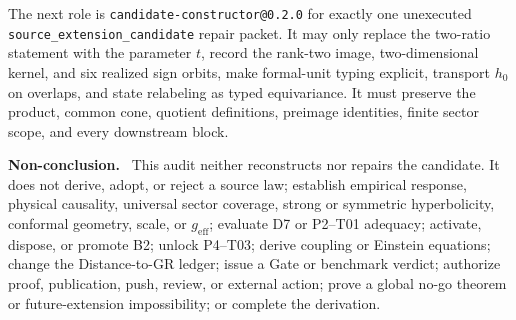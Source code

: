 \documentclass[11pt]{article}
\newenvironment{nonconclusion}{\par\smallskip\noindent\textbf{Non-conclusion.}\ }{\par\smallskip}
\begin{document}
The next role is \texttt{candidate-constructor@0.2.0} for exactly one
unexecuted \texttt{source\_extension\_candidate} repair packet.  It may only
replace the two-ratio statement with the parameter $t$, record the rank-two
image, two-dimensional kernel, and six realized sign orbits, make formal-unit
typing explicit, transport $h_0$ on overlaps, and state relabeling as typed
equivariance.  It must preserve the product, common cone, quotient definitions,
preimage identities, finite sector scope, and every downstream block.

\begin{nonconclusion}
This audit neither reconstructs nor repairs the candidate.  It does not derive,
adopt, or reject a source law; establish empirical response, physical causality,
universal sector coverage, strong or symmetric hyperbolicity, conformal
geometry, scale, or $g_{\mathrm{eff}}$; evaluate D7 or P2--T01 adequacy;
activate, dispose, or promote B2; unlock P4--T03; derive coupling or Einstein
equations; change the Distance-to-GR ledger; issue a Gate or benchmark verdict;
authorize proof, publication, push, review, or external action; prove a global
no-go theorem or future-extension impossibility; or complete the derivation.
\end{nonconclusion}
\end{document}
